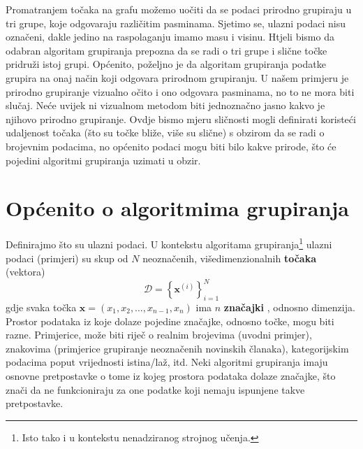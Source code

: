 \documentclass[times, utf8, zavrsni]{fer}
\begin{document}
Promatranjem točaka na grafu možemo uočiti da se podaci prirodno grupiraju u tri grupe, koje odgovaraju različitim pasminama. Sjetimo se, ulazni podaci nisu označeni, dakle jedino na raspolaganju imamo masu i visinu. Htjeli bismo da odabran algoritam grupiranja prepozna da se radi o tri grupe i slične točke pridruži istoj grupi. Općenito, poželjno je da algoritam grupiranja podatke grupira na onaj način koji odgovara prirodnom grupiranju. U našem primjeru je prirodno grupiranje vizualno očito i ono odgovara pasminama, no to ne mora biti slučaj. Neće uvijek ni vizualnom metodom biti jednoznačno jasno kakvo je njihovo prirodno grupiranje. Ovdje bismo mjeru sličnosti mogli definirati koristeći udaljenost točaka (što su točke bliže, više su slične) s obzirom da se radi o brojevnim podacima, no općenito podaci mogu biti bilo kakve prirode, što će pojedini algoritmi grupiranja uzimati u obzir.

\chapter{Općenito o algoritmima grupiranja}
Definirajmo što su ulazni podaci. U kontekstu algoritama grupiranja\footnote{Isto tako i u kontekstu nenadziranog strojnog učenja.} ulazni podaci (primjeri) su skup od $N$ neoznačenih, višedimenzionalnih \textbf{točaka} (vektora) \[\mathcal{D} = \left\{ \mathbf{x}^{(i)} \right\}_{i=1}^{N} \]
gdje svaka točka $\mathbf{x} = \left(x_1, x_2, \dots, x_{n-1}, x_n\right)$ ima $n$ \textbf{značajki} , odnosno dimenzija. Prostor podataka iz koje dolaze pojedine značajke, odnosno točke, mogu biti razne. Primjerice, može biti riječ o realnim brojevima (uvodni primjer), znakovima (primjerice grupiranje neoznačenih novinskih članaka), kategorijskim podacima poput vrijednosti istina/laž, itd. Neki algoritmi grupiranja imaju osnovne pretpostavke o tome iz kojeg prostora podataka dolaze značajke, što znači da ne funkcioniraju za one podatke koji nemaju ispunjene takve pretpostavke.
\end{document}

